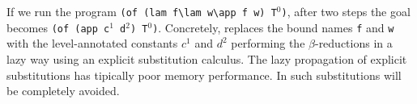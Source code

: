 \documentclass{llncs}
\begin{document}
If we run the program
\verb+(of (lam f\lam w\app f w) T+$^0$\verb+)+, after two steps the goal becomes
\verb+(of (app c+$^1$\verb+ d+$^2$\verb+) T+$^0$\verb+)+.
Concretely, \tedius{} replaces the bound names \verb+f+ and \verb+w+ with the level-annotated constants $c^1$ and $d^2$ performing the $\beta$-reductions
in a lazy way using an explicit substitution calculus. The lazy propagation
of explicit substitutions has tipically poor memory performance.
In \rff{} such substitutions will be completely avoided.

% 
% 
\end{document}
